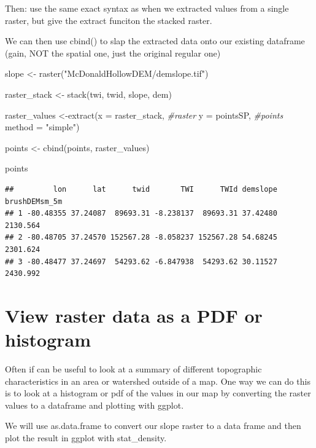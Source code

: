 \documentclass[
]{book}
\newenvironment{Shaded}{\begin{snugshade}}{\end{snugshade}}
\newcommand{\AttributeTok}[1]{\textcolor[rgb]{0.77,0.63,0.00}{#1}}
\newcommand{\CommentTok}[1]{\textcolor[rgb]{0.56,0.35,0.01}{\textit{#1}}}
\newcommand{\FunctionTok}[1]{\textcolor[rgb]{0.00,0.00,0.00}{#1}}
\newcommand{\NormalTok}[1]{#1}
\newcommand{\OtherTok}[1]{\textcolor[rgb]{0.56,0.35,0.01}{#1}}
\newcommand{\StringTok}[1]{\textcolor[rgb]{0.31,0.60,0.02}{#1}}
\begin{document}
Then: use the same exact syntax as when we extracted values from a single raster, but give the extract funciton the stacked raster.

We can then use cbind() to slap the extracted data onto our existing dataframe (gain, NOT the spatial one, just the original regular one)

\begin{Shaded}
\begin{Highlighting}[]
\NormalTok{slope }\OtherTok{\textless{}{-}} \FunctionTok{raster}\NormalTok{(}\StringTok{"McDonaldHollowDEM/demslope.tif"}\NormalTok{)}

\NormalTok{raster\_stack }\OtherTok{\textless{}{-}} \FunctionTok{stack}\NormalTok{(twi, twid, slope, dem)}

\NormalTok{raster\_values }\OtherTok{\textless{}{-}}\FunctionTok{extract}\NormalTok{(}\AttributeTok{x =}\NormalTok{ raster\_stack, }\CommentTok{\#raster }
                 \AttributeTok{y =}\NormalTok{ pointsSP, }\CommentTok{\#points}
                 \AttributeTok{method =} \StringTok{"simple"}\NormalTok{)}

\NormalTok{points }\OtherTok{\textless{}{-}} \FunctionTok{cbind}\NormalTok{(points, raster\_values)}

\NormalTok{points}
\end{Highlighting}
\end{Shaded}

\begin{verbatim}
##         lon      lat      twid       TWI      TWId demslope brushDEMsm_5m
## 1 -80.48355 37.24087  89693.31 -8.238137  89693.31 37.42480      2130.564
## 2 -80.48705 37.24570 152567.28 -8.058237 152567.28 54.68245      2301.624
## 3 -80.48477 37.24697  54293.62 -6.847938  54293.62 30.11527      2430.992
\end{verbatim}

\hypertarget{view-raster-data-as-a-pdf-or-histogram}{%
\section{View raster data as a PDF or histogram}\label{view-raster-data-as-a-pdf-or-histogram}}

Often if can be useful to look at a summary of different topographic characteristics in an area or watershed outside of a map. One way we can do this is to look at a histogram or pdf of the values in our map by converting the raster values to a dataframe and plotting with ggplot.

We will use as.data.frame to convert our slope raster to a data frame and then plot the result in ggplot with stat\_density.
\end{document}
